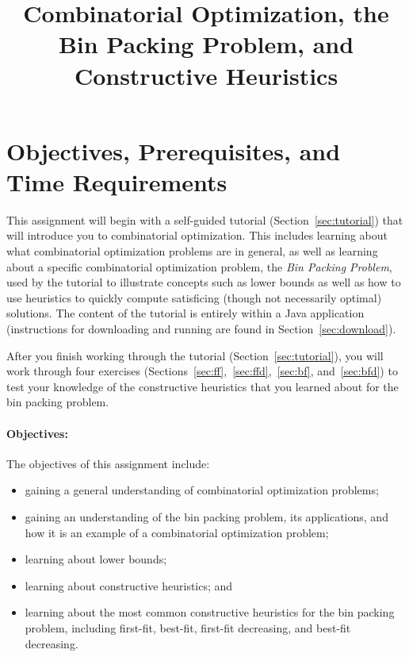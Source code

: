\documentclass[11pt,letterpaper]{article}
\begin{document}
\title{Combinatorial Optimization, the Bin Packing Problem, 
and Constructive Heuristics}

\author{}

\date{}

\maketitle


\section{Objectives, Prerequisites, and Time Requirements}\label{sec:objectives}
This assignment will begin with a self-guided tutorial 
(Section~\ref{sec:tutorial}) that will introduce you to combinatorial 
optimization. This includes learning about what combinatorial optimization
problems are in general, as well as learning about a specific 
combinatorial optimization problem, the {\em Bin Packing Problem},
used by the tutorial to illustrate concepts such as lower bounds
as well as how to use heuristics to quickly compute satisficing
(though not necessarily optimal) solutions. The content of the tutorial
is entirely within a Java application (instructions for downloading
and running are found in Section~\ref{sec:download}).

After you finish working through the tutorial (Section~\ref{sec:tutorial}),
you will work through four exercises 
(Sections~\ref{sec:ff},~\ref{sec:ffd},~\ref{sec:bf}, and~\ref{sec:bfd}) 
to test your knowledge of the constructive heuristics that you learned 
about for the bin packing problem.

\paragraph*{Objectives:} The objectives of this assignment include:
\begin{itemize}[leftmargin=*, parsep=0pt, itemsep=2pt, topsep=2pt]
\item gaining a general understanding of combinatorial optimization problems;
\item gaining an understanding of the bin packing problem, its 
applications, and how it is an example of a combinatorial 
optimization problem;
\item learning about lower bounds;
\item learning about constructive heuristics; and
\item learning about the most common constructive heuristics 
for the bin packing problem, including first-fit, best-fit, 
first-fit decreasing, and best-fit decreasing.
\end{itemize}
\end{document}
